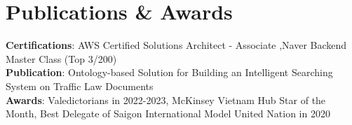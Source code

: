 \section{Publications \& Awards}
    \begin{itemize}[leftmargin=0.15in, label={}]
	\small{\item{
		\textbf{Certifications}{: AWS Certified Solutions Architect - Associate ,Naver Backend Master Class (Top 3/200)} \\
		\textbf{Publication}{: Ontology-based Solution for Building an Intelligent Searching System on Traffic Law Documents} \\
            \textbf{Awards}{: Valedictorians in 2022-2023, McKinsey Vietnam Hub Star of the Month, Best Delegate of Saigon International Model United Nation in 2020} \\
	}}
    \end{itemize}